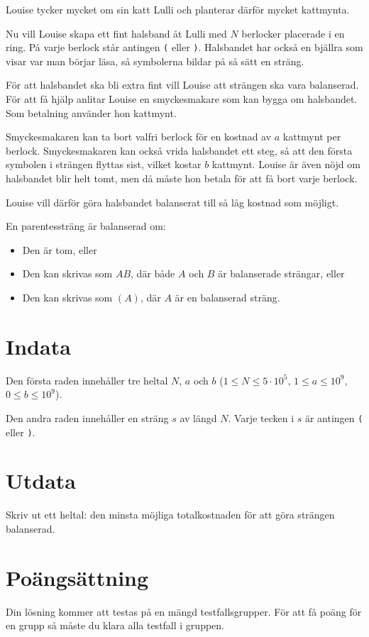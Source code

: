 \noindent

Louise tycker mycket om sin katt Lulli och planterar därför mycket kattmynta.

Nu vill Louise skapa ett fint halsband åt Lulli med $N$ berlocker placerade i en ring.
På varje berlock står antingen \texttt{(} eller \texttt{)}.
Halsbandet har också en bjällra som visar var man börjar läsa, så symbolerna bildar på så sätt en sträng.

För att halsbandet ska bli extra fint vill Louise att strängen ska vara balanserad.
För att få hjälp anlitar Louise en smyckesmakare som kan bygga om halsbandet. Som betalning använder hon kattmynt.

Smyckesmakaren kan ta bort valfri berlock för en kostnad av $a$ kattmynt per berlock.
Smyckesmakaren kan också vrida halsbandet ett steg, så att den första symbolen i strängen flyttas sist, vilket kostar $b$ kattmynt.
Louise är även nöjd om halsbandet blir helt tomt, men då måste hon betala för att få bort varje berlock.

Louise vill därför göra halsbandet balanserat till så låg kostnad som möjligt.

En parentessträng är balanserad om:
\begin{itemize}
    \item Den är tom, eller
    \item Den kan skrivas som $AB$, där både $A$ och $B$ är balanserade strängar, eller
    \item Den kan skrivas som $(A)$, där $A$ är en balanserad sträng.
\end{itemize}


\section*{Indata}
Den första raden innehåller tre heltal $N$, $a$ och $b$ ($1 \leq N \leq 5 \cdot 10^5$, $1 \leq a \leq 10^9$, $0 \leq b \leq 10^9$).

Den andra raden innehåller en sträng $s$ av längd $N$.
Varje tecken i $s$ är antingen \texttt{(} eller \texttt{)}.

\section*{Utdata}
Skriv ut ett heltal: den minsta möjliga totalkostnaden för att göra strängen balanserad.


\section*{Poängsättning}
Din lösning kommer att testas på en mängd testfallsgrupper.
För att få poäng för en grupp så måste du klara alla testfall i gruppen.

